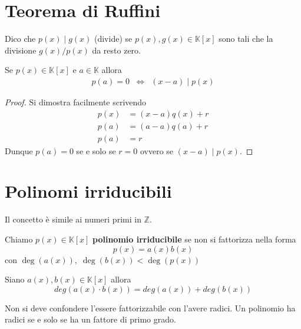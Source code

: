 \section{Teorema di Ruffini}
\begin{defn}
	Dico che $p(x) \mid g(x)$ (divide) se $p(x), g(x) \in \mathbb{K}[x]$ sono tali che
	la divisione $g(x) / p(x)$ da resto zero.
\end{defn}

\begin{theorem}
	Se $p(x) \in \mathbb{K}[x]$ e $a \in \mathbb{K}$ allora
	\begin{equation*}
		\begin{array}{ccc}
			p(a) = 0 & \Leftrightarrow & (x - a) \mid p(x)
		\end{array}
	\end{equation*}
	\begin{proof}
		Si dimostra facilmente scrivendo
		\begin{equation*}
			\begin{array}{ll}
				p(x) & = (x - a) q(x) + r \\
				p(a) & = (a - a) q(a) + r \\
				p(a) & = r
			\end{array}
		\end{equation*}
		Dunque $p(a) = 0$ se e solo se $r = 0$ ovvero se $(x - a) \mid p(x)$.
	\end{proof}
\end{theorem}

\section{Polinomi irriducibili}
Il concetto \`e simile ai numeri primi in $\mathbb{Z}$.

\begin{defn}
	Chiamo $p(x) \in \mathbb{K}[x]$ \textbf{polinomio irriducibile} se non si fattorizza nella forma
	\[ p(x) = a(x)b(x) \]
	con $\deg(a(x)),\; \deg(b(x)) < \deg(p(x))$
\end{defn}

\begin{observation}
	Siano $a(x), b(x) \in \mathbb{K}[x]$ allora
	\begin{equation*}
		deg(a(x) \cdot b(x)) = deg(a(x)) + deg(b(x))
	\end{equation*}
\end{observation}

\begin{observation}
	Non si deve confondere l'essere fattorizzabile con l'avere radici. Un polinomio ha
	radici se e solo se ha un fattore di primo grado.
\end{observation}

